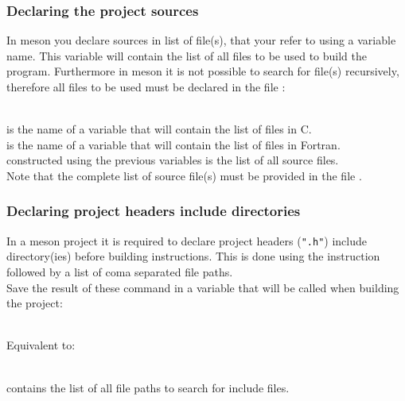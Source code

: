 \subsubsection*{Declaring the project sources}

In meson you declare sources in list of file(s), that your refer to using a variable name. 
This variable will contain the list of all files to be used to build the program. 
Furthermore in meson it is not possible to search for file(s) recursively, therefore all files to be used must be declared in the file :
\begin{script}
\end{script}
\\[-0.5cm]
\noindent {} is the name of a variable that will contain the list of files in C. \\[0.25cm]
 is the name of a variable that will contain the list of files in Fortran. \\[0.25cm]
 constructed using the previous variables is the list of all source files. \\[0.25cm]
Note that the complete list of source file(s) must be provided in the file . 

\subsubsection*{Declaring project headers include directories}

In a meson project it is required to declare project headers (\texttt{".h"}) include directory(ies) before building instructions. 
This is done using the  instruction followed by a list of coma separated file paths. \\
Save the result of these command in a variable that will be called when building the project:
\vspace{-0.25cm}
\begin{script}
 
\end{script}
\\[-0.75cm]
Equivalent to:
\vspace{-0.125cm}
\begin{script}
 
\end{script}
\\[-0.25cm]
\noindent {} contains the list of all file paths to search for include files. 
\newpage

